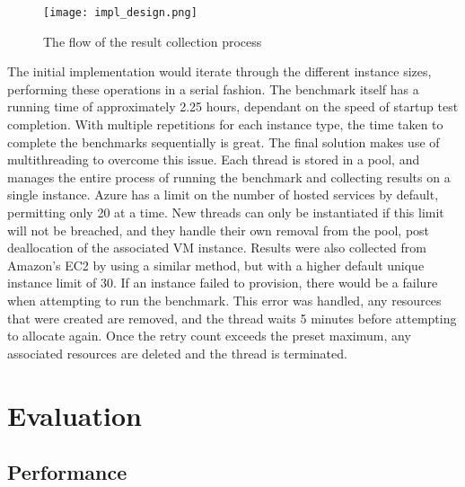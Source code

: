 \documentclass{entcs} \usepackage{entcsmacro}
\begin{document}
\begin{figure}[ht]
  \centering
  \texttt{[image: impl\_design.png]}
  \caption{The flow of the result collection process}
  \label{fig:impldesign}
\end{figure}

The initial implementation would iterate through the different instance sizes, performing these operations in a serial fashion. The benchmark itself has a running time of approximately 2.25 hours, dependant on the speed of startup test completion. With multiple repetitions for each instance type, the time taken to complete the benchmarks sequentially is great. The final solution makes use of multithreading to overcome this issue. Each thread is stored in a pool, and manages the entire process of running the benchmark and collecting results on a single instance. Azure has a limit on the number of hosted services by default, permitting only 20 at a time. New threads can only be instantiated if this limit will not be breached, and they handle their own removal from the pool, post deallocation of the associated VM instance. Results were also collected from Amazon's EC2 by using a similar method, but with a higher default unique instance limit of 30. If an instance failed to provision, there would be a failure when attempting to run the benchmark. This error was handled, any resources that were created are removed, and the thread waits 5 minutes before attempting to allocate again. Once the retry count exceeds the preset maximum, any associated resources are deleted and the thread is terminated.



\section{Evaluation}

\subsection{Performance}\label{sec:eval:performance}
\end{document}

